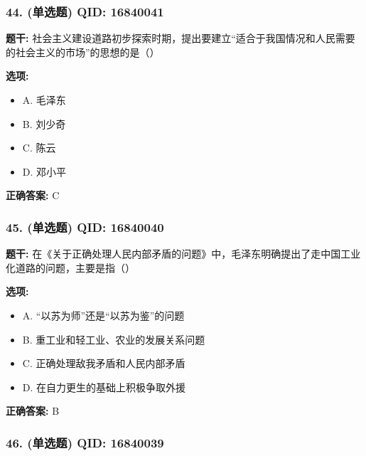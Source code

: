 \documentclass[12pt,UTF8]{ctexart}
\begin{document}
\subsubsection*{44. (单选题) \small QID: 16840041}

\textbf{题干:}
社会主义建设道路初步探索时期，提出要建立“适合于我国情况和人民需要的社会主义的市场”的思想的是（）

\textbf{选项:}
\begin{itemize}[leftmargin=*]

  \item A. 毛泽东

  \item B. 刘少奇

  \item C. 陈云

  \item D. 邓小平

\end{itemize}

\textbf{正确答案:}
C

\vspace{0.3em}\hrulefill\vspace{0.7em}

\subsubsection*{45. (单选题) \small QID: 16840040}

\textbf{题干:}
在《关于正确处理人民内部矛盾的问题》中，毛泽东明确提出了走中国工业化道路的问题，主要是指（）

\textbf{选项:}
\begin{itemize}[leftmargin=*]

  \item A. “以苏为师”还是“以苏为鉴”的问题

  \item B. 重工业和轻工业、农业的发展关系问题

  \item C. 正确处理敌我矛盾和人民内部矛盾

  \item D. 在自力更生的基础上积极争取外援

\end{itemize}

\textbf{正确答案:}
B

\vspace{0.3em}\hrulefill\vspace{0.7em}

\subsubsection*{46. (单选题) \small QID: 16840039}
\end{document}
